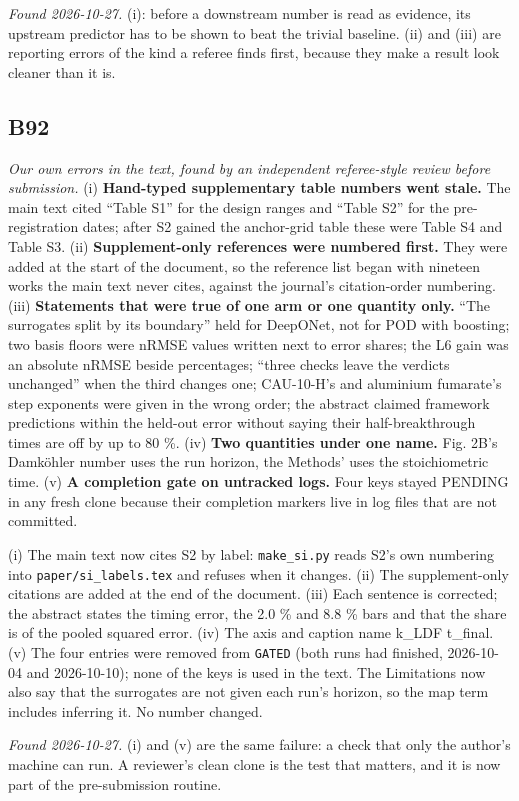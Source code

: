 \documentclass[10pt]{article}
\begin{document}
\begin{description}[leftmargin=0pt,itemsep=1pt]
\item[Note.] \emph{Found 2026-10-27.} (i): before a downstream number is read as evidence, its upstream predictor has to be shown to beat the trivial baseline. (ii) and (iii) are reporting errors of the kind a referee finds first, because they make a result look cleaner than it is.
\end{description}
\subsection*{B92}\label{led:B92}
\begin{description}[leftmargin=0pt,itemsep=1pt]
\item[Defect.] \emph{Our own errors in the text, found by an independent referee-style review before submission.} (i) \textbf{Hand-typed supplementary table numbers went stale.} The main text cited ``Table S1'' for the design ranges and ``Table S2'' for the pre-registration dates; after S2 gained the anchor-grid table these were Table S4 and Table S3. (ii) \textbf{Supplement-only references were numbered first.} They were added at the start of the document, so the reference list began with nineteen works the main text never cites, against the journal's citation-order numbering. (iii) \textbf{Statements that were true of one arm or one quantity only.} ``The surrogates split by its boundary'' held for DeepONet, not for POD with boosting; two basis floors were nRMSE values written next to error shares; the L6 gain was an absolute nRMSE beside percentages; ``three checks leave the verdicts unchanged'' when the third changes one; CAU-10-H's and aluminium fumarate's step exponents were given in the wrong order; the abstract claimed framework predictions within the held-out error without saying their half-breakthrough times are off by up to 80 \%. (iv) \textbf{Two quantities under one name.} Fig. 2B's Damk\"ohler number uses the run horizon, the Methods' uses the stoichiometric time. (v) \textbf{A completion gate on untracked logs.} Four keys stayed PENDING in any fresh clone because their completion markers live in log files that are not committed.
\item[Resolution.] (i) The main text now cites S2 by label: \texttt{make\_si.py} reads S2's own numbering into \texttt{paper/si\_labels.tex} and refuses when it changes. (ii) The supplement-only citations are added at the end of the document. (iii) Each sentence is corrected; the abstract states the timing error, the 2.0 \% and 8.8 \% bars and that the share is of the pooled squared error. (iv) The axis and caption name k\_LDF t\_final. (v) The four entries were removed from \texttt{GATED} (both runs had finished, 2026-10-04 and 2026-10-10); none of the keys is used in the text. The Limitations now also say that the surrogates are not given each run's horizon, so the map term includes inferring it. No number changed.
\item[Note.] \emph{Found 2026-10-27.} (i) and (v) are the same failure: a check that only the author's machine can run. A reviewer's clean clone is the test that matters, and it is now part of the pre-submission routine.
\end{description}
\end{document}
